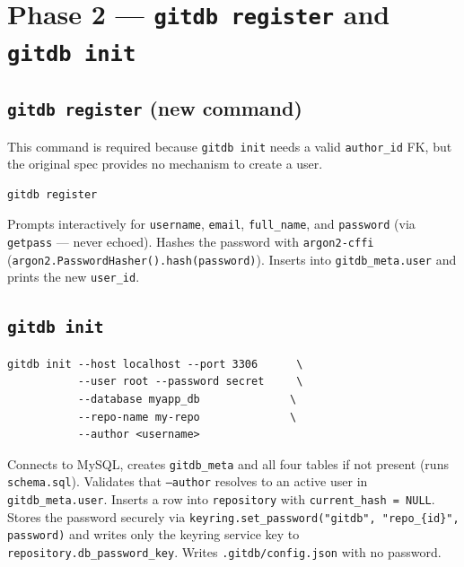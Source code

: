 \documentclass[12pt, a4paper]{article}
\begin{document}
\section{Phase 2 --- \texttt{gitdb register} and \texttt{gitdb init}}

\subsection{\texttt{gitdb register} (new command)}

This command is required because \texttt{gitdb init} needs a valid
\texttt{author\_id} FK, but the original spec provides no mechanism to create
a user.

\begin{tcolorbox}[commandbox, title=\texttt{gitdb register}]
\begin{lstlisting}
gitdb register
\end{lstlisting}
\textcolor{codetext}{\small Prompts interactively for \texttt{username},
\texttt{email}, \texttt{full\_name}, and \texttt{password} (via
\texttt{getpass} --- never echoed). Hashes the password with
\texttt{argon2-cffi} (\texttt{argon2.PasswordHasher().hash(password)}).
Inserts into \texttt{gitdb\_meta.user} and prints the new \texttt{user\_id}.}
\end{tcolorbox}

\subsection{\texttt{gitdb init}}

\begin{tcolorbox}[commandbox, title=\texttt{gitdb init}]
\begin{lstlisting}
gitdb init --host localhost --port 3306      \
           --user root --password secret     \
           --database myapp_db              \
           --repo-name my-repo              \
           --author <username>
\end{lstlisting}
\textcolor{codetext}{\small Connects to MySQL, creates \texttt{gitdb\_meta}
and all four tables if not present (runs \texttt{schema.sql}). Validates that
\texttt{--author} resolves to an active user in \texttt{gitdb\_meta.user}.
Inserts a row into \texttt{repository} with \texttt{current\_hash = NULL}.
Stores the password securely via
\texttt{keyring.set\_password("gitdb", "repo\_\{id\}", password)} and writes
only the keyring service key to \texttt{repository.db\_password\_key}.
Writes \texttt{.gitdb/config.json} with no password.}
\end{tcolorbox}
\end{document}

